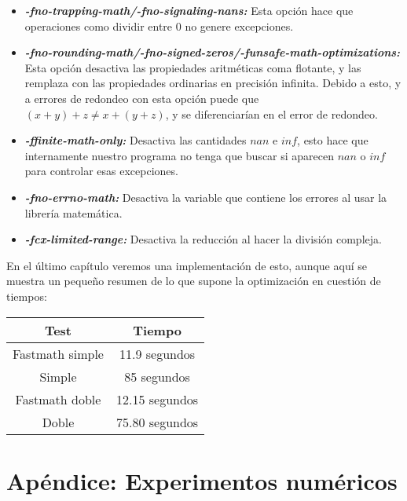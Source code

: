 \begin{itemize}
	\item \textbf{\textit{-fno-trapping-math/-fno-signaling-nans: }} Esta opción hace que operaciones como dividir entre $0$ no genere excepciones.
	
	\item \textbf{\textit{-fno-rounding-math/-fno-signed-zeros/-funsafe-math-optimizations: }} Esta opción desactiva las propiedades aritméticas coma flotante, y las remplaza con las propiedades ordinarias en precisión infinita. Debido a esto, y a errores de redondeo con esta opción puede que $(x+y)+z \neq x + (y+z)$, y se diferenciarían en el error de redondeo.
	
	\item \textbf{\textit{-ffinite-math-only: }} Desactiva las cantidades $nan$ e $inf$, esto hace que internamente nuestro programa no tenga que buscar si aparecen $nan$ o $inf$ para controlar esas excepciones.
	
	\item \textbf{\textit{-fno-errno-math: }} Desactiva la variable que contiene los errores al usar la librería matemática.
	
	\item \textbf{\textit{-fcx-limited-range: }} Desactiva la reducción al hacer la división compleja.
\end{itemize}

En el último capítulo veremos una implementación de esto, aunque aquí se muestra un pequeño resumen de lo que supone la optimización en cuestión de tiempos:

\begin{table}[H]
	\centering
	\begin{tabular}{|c|c|}
		\hline
		\textbf{Test}  & \textbf{Tiempo}        \\ \hline
		Fastmath simple & 11.9 segundos \\ 
		Simple     & 85 segundos    \\
		Fastmath doble   & 12.15 segundos    \\
		Doble   & 75.80 segundos \\ \hline
	\end{tabular}%
\end{table}

\iffalse
\section{Apéndice: Experimentos numéricos}

